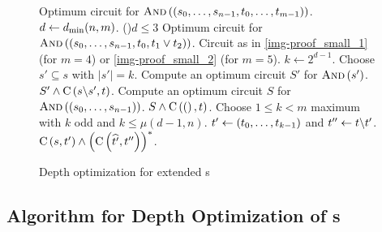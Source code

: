  \begin{figure}[t]
 \begin{algorithm}[H]
 \caption{Depth optimization for extended \aop{}s}
 \label{grinchuk-alg}
    \DontPrintSemicolon
    \BlankLine

    { \label{algo base start}
     \Return Optimum circuit for $\sym\DBkt{s_0, \dotsc, s_{n-1}, t_0, \dotsc, t_{m-1}}$.   \label{algo m 2}
    }
    $d \gets \dmin(n, m)$.  \label{algo compute d}
    \If(){$d \leq 3$}
    {
     {
       \Return Optimum circuit for $\sym\DBkt{s_0, \dotsc, s_{n-1}, t_0, t_1 \lor t_2}$.  \label{algo m 3}
     }
     {
       \Return Circuit as in \cref{img-proof_small_1} (for $m = 4$) or 
       \cref{img-proof_small_2} (for $m = 5$).\; \label{algo base end}
     }
    }
    {
       $k \gets 2^{d-1}$.\;
       Choose $s' \subseteq s$ with $|s'| = k$.\; \label{algo det s'}
       Compute an optimum circuit $S'$ for $\sym\Bkt{s'}$.\;
       \Return $S' \land \depthckt\Bkt{s \backslash s', t}$.\; \label{algo sym split}
    }
    \Else
    {
       {
       Compute an optimum circuit $S$ for $\sym\DBkt{s_0, \dotsc, s_{n-1}}$.\;
       \Return $S \land \depthckt\Bkt{\Bkt{}, t}$.\; \label{algo simple split}
       }
       Choose $1 \leq k < m$ maximum with $k$ odd and $k \leq \mu(d-1, n)$.\; \label{algo compute k}
       $\prefix{t}{k} \gets \Bkt{t_0, \dotsc, t_{k-1}}$ and $\suffix{t}{k} \gets t \backslash \prefix{t}{k}$.\;
       \Return $\depthckt\Bkt{s, \prefix{t}{k}} \land \Bkt{\depthckt\Bkt{\everysecond{\prefix{t}{k}}, \suffix{t}{k}}}^*$.\; \label{Grinchuk algo end}
    }
 \end{algorithm}
 \end{figure}

\subsection{Algorithm for Depth Optimization of \AOP{}s} \label{sec-grinchuk}

